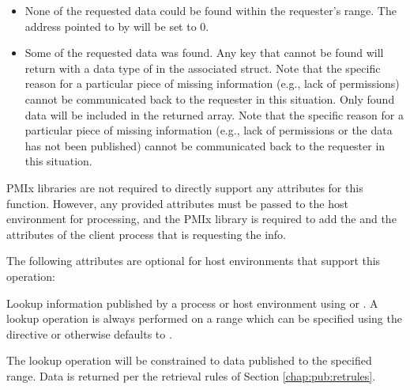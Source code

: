 \returnstart
\begin{itemize}
\item {} None of the requested data could be found within the requester's range.  The address pointed to by  will be set to 0.

\item {} Some of the requested data was found.  
Any key that cannot be found will return with a data type of  in the associated  struct. Note that the specific reason for a particular piece of missing information (e.g., lack of permissions) cannot be communicated back to the requester in this situation.
Only found data will be included in the returned  array. Note that the specific reason for a particular piece of missing information (e.g., lack of permissions or the data has not been published) cannot be communicated back to the requester in this situation.

\end{itemize}
\returnend

\reqattrstart
\ac{PMIx} libraries are not required to directly support any attributes for this function. However, any provided attributes must be passed to the host environment for processing, and the \ac{PMIx} library is required to add the  and the  attributes of the client process that is requesting the info.

\reqattrend

\optattrstart
The following attributes are optional for host environments that support this operation:


\optattrend

\descr

Lookup information published by a process or host environment using  
or .
A lookup operation is always performed on a range which can be specified using the directive  or otherwise defaults to .

The lookup operation will be constrained to data published to the specified range.
Data is returned per the retrieval rules of Section \ref{chap:pub:retrules}.

